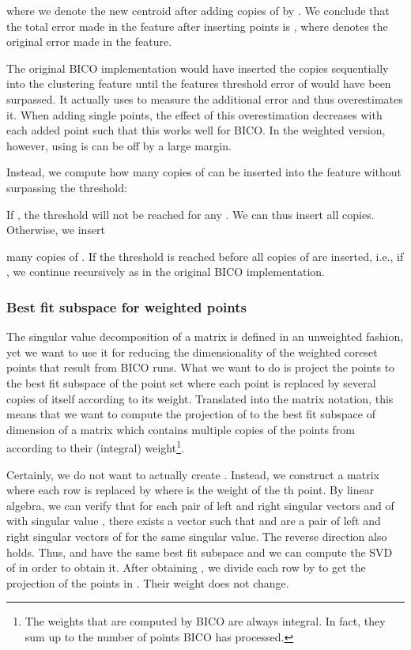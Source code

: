 \documentclass[a4paper]{scrartcl}
\makeatletter
\newcommand{\ie}{i.\nolinebreak[4]\hspace{0.125em}\nolinebreak[4]e.,\@\xspace}
\makeatother
\begin{document}
where we denote the new centroid after adding  copies of  by .
We conclude that the total error made in the feature after inserting  points is
, where  denotes the original error made in the feature.

The original BICO implementation would have inserted the  copies sequentially into the clustering feature
until the features threshold error of  would have been surpassed. It actually uses  to measure the additional error and thus overestimates it. When adding single points, the effect of this overestimation decreases with each added point such that this works well for BICO. In the weighted version, however, using  is can be off by a large margin.

Instead,
we compute how many copies  of  can be inserted into the
feature without surpassing the threshold:

If , the threshold will not be reached for any .
We can thus insert all  copies. Otherwise, we insert

many copies of . If the threshold is reached before all  copies of  are inserted, \ie if ,
we continue recursively as in the original BICO implementation.

\subsubsection{Best fit subspace for weighted points}

The singular value decomposition of a matrix is defined in an unweighted fashion, yet we want to use it for reducing the dimensionality of the weighted coreset points that result from BICO runs. What we want to do is project the points to the best fit subspace of the point set where each point is replaced by several copies of itself according to its weight. Translated into the matrix notation, this means that we want to compute the projection of  to the best fit subspace of dimension  of a matrix  which contains multiple copies of the points from  according to their (integral) weight\footnote{The weights that are computed by BICO are always integral. In fact, they sum up to the number of points BICO has processed.}.

Certainly, we do not want to actually create . Instead, we construct a matrix  where each row  is replaced by  where  is the weight of the th point. By linear algebra, we can verify that for each pair of left and right singular vectors  and  of  with singular value , there exists a vector  such that  and  are a pair of left and right singular vectors of  for the same singular value. The reverse direction also holds. Thus,  and  have the same best fit subspace and we can compute the SVD of  in order to obtain it. After obtaining , we divide each row  by  to get the projection of the points in . Their weight does not change.
\end{document}
